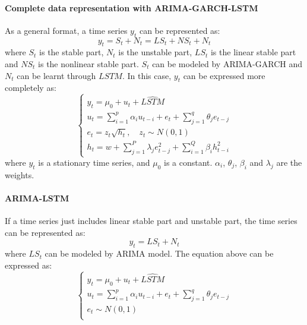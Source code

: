 \paragraph{Complete data representation with ARIMA-GARCH-LSTM}
\vspace{-0.10in}
As a general format, a time series $y_t$ can be represented as:
\begin{equation}
     y_t = S_t + N_t = LS_t + NS_t + N_t
\end{equation}
where $S_t$ is the  stable part, $N_t$ is the unstable part, $LS_t$ is the linear stable part and $NS_t$ is the nonlinear stable part.  $S_t$ can be modeled by ARIMA-GARCH and $N_t$ can be learnt through $LSTM$. In this case, $y_t$ can be expressed more completely as:
\begin{equation}
\begin{cases}
    y_t = \mu_0  + u_t + \widehat{LSTM} \\
    u_t = \sum_{i=1}^{p} {\alpha_i{u_{t-i}}} + e_t+ \sum_{j=1}^{q} {\theta_j{e_{t-j}}}\\
    e_t = z_t{\sqrt{h_t}}, \quad  z_t\sim N(0,1)\\
    h_t = w+\sum_{j=1}^{P}{\lambda_j{e_{t-j}^2}}+\sum_{i=1}^{Q}{\beta_i{h_{t-i}^2}}
\end{cases}
\end{equation}
where $y_t$ is a stationary time series, and $\mu_0$ is a constant.  $\alpha_i$, $\theta_j$, $\beta_i$ and $\lambda_j$ are the weights. 

                    
\paragraph{ARIMA-LSTM}
\vspace{-0.10in}
If a time series just includes linear stable part and unstable part, the time series can be represented as:
\begin{equation}
     y_t = LS_t +  N_t
\end{equation}
where $LS_t$ can be modeled by ARIMA model. The equation above can be expressed as:
\begin{equation}
\begin{cases}
    y_t = \mu_0 + u_t + \widehat{LSTM} \\
    u_t = \sum_{i=1}^{p} {\alpha_i{u_{t-i}}} + e_t+ \sum_{j=1}^{q} {\theta_j{e_{t-j}}} \\
    e_t\sim N(0,1) \\
\end{cases}
\end{equation}

